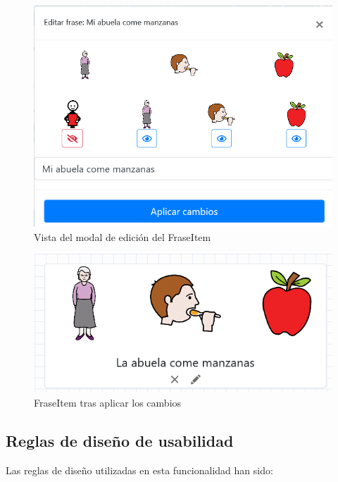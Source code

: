 \begin{figure}[h!]
	\centering
	\includegraphics[width=0.7\linewidth]{Imagenes/Bitmap/modalEditarFraseItem}
	\caption{Vista del modal de edición del FraseItem}
	\label{fig:modaleditarfraseitem}
\end{figure}

\begin{figure}[h!]
	\centering
	\includegraphics[width=0.7\linewidth]{Imagenes/Bitmap/fraseItemMidificada}
	\caption{FraseItem tras  aplicar los cambios}
	\label{fig:fraseitemmidificada}
\end{figure}

\subsection{Reglas de diseño de usabilidad}
 Las reglas de diseño utilizadas en esta funcionalidad han sido:
 
